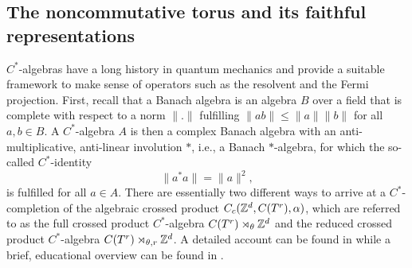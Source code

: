 \documentclass[submission, Phys]{SciPost}
\begin{document}
\subsection{The noncommutative torus and its faithful representations}
\label{subsec:noncommutative_torus}

$C^\ast$-algebras have a long history in quantum mechanics \cite{Murray1936} and provide a suitable framework to make sense of operators such as the resolvent and the Fermi projection.
First, recall that a Banach algebra is an algebra $B$ over a field that is complete with respect to a norm $\| . \|$ fulfilling $\| a b \| \leq \|a \| \|b\|$ for all $a,b \in B$.
A $C^\ast$-algebra $A$ is then a complex Banach algebra with an anti-multiplicative, anti-linear involution $\ast$, i.e., a Banach $\ast$-algebra, for which the so-called $C^\ast$-identity
\begin{equation}
    \|a^\ast a \| = \|a \|^2, 
\end{equation}
is fulfilled for all $a \in A$.
There are essentially two different ways to arrive at a $C^\ast$-completion of the algebraic crossed product $C_c(\mathbb{Z}^d, C(T^r), \alpha )$, which are referred to as the full crossed product $C^\ast$-algebra $C(T^r)\rtimes_\theta \mathbb{Z}^d$
and the reduced crossed product $C^\ast$-algebra $C(T^r)\rtimes_{\theta,r} \mathbb{Z}^d$.
A detailed account can be found in \cite[Ch.~7]{Pedersen2018} while a brief, educational overview can be found in \cite[Example~2.2.7]{Khalkhali2013}.
\end{document}
